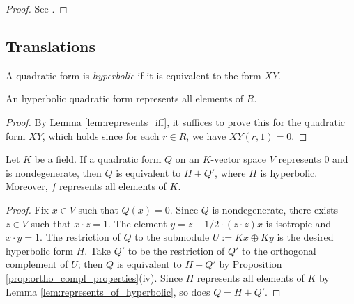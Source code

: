 \begin{proof}
	See \cite[\S IV.1.4, Lemma after Theorem 2]{Ser73}.
\end{proof}

\subsection{Translations}\label{subsec:translations}

\begin{definition}\label{def:hyperbolic}
\leanok
A quadratic form is \emph{hyperbolic} if it is equivalent to the form $XY$.
\end{definition}

\begin{lemma}\label{lem:represents_of_hyperbolic}
\leanok
{}
An hyperbolic quadratic form represents all elements of $R$.
\end{lemma}
\begin{proof}
\leanok 
{}
By Lemma \ref{lem:represents_iff}, it suffices to prove this for the quadratic form $XY$, which holds since for each $r \in R$, we have $XY(r, 1) = 0$.
\end{proof}


\begin{proposition}\label{prop:sum_hyperbolic}
\leanok
{}
Let $K$ be a field. If a quadratic form $Q$ on an $K$-vector space $V$ represents $0$ and is nondegenerate, then $Q$ is equivalent to $H + Q'$, where $H$ is hyperbolic. Moreover, $f$ represents all elements of $K$.
\end{proposition}
\begin{proof}
\leanok
{}
Fix $x \in V$ such that $Q(x) = 0$. Since $Q$ is nondegenerate, there exists $z \in V$ such that $x \cdot z = 1$. The element $y = z - 1/2 \cdot(z\cdot z)x$ is isotropic and $x \cdot y = 1$.
The restriction of $Q$ to the submodule $U := Kx \oplus Ky$ is the desired hyperbolic form $H$. Take $Q'$ to be the restriction of $Q'$ to the orthogonal complement of $U$; then $Q$ is equivalent to $H + Q'$ by Proposition \ref{prop:ortho_compl_properties}(iv).
Since $H$ represents all elements of $K$ by Lemma \ref{lem:represents_of_hyperbolic}, so does $Q = H + Q'$. 
\end{proof}

